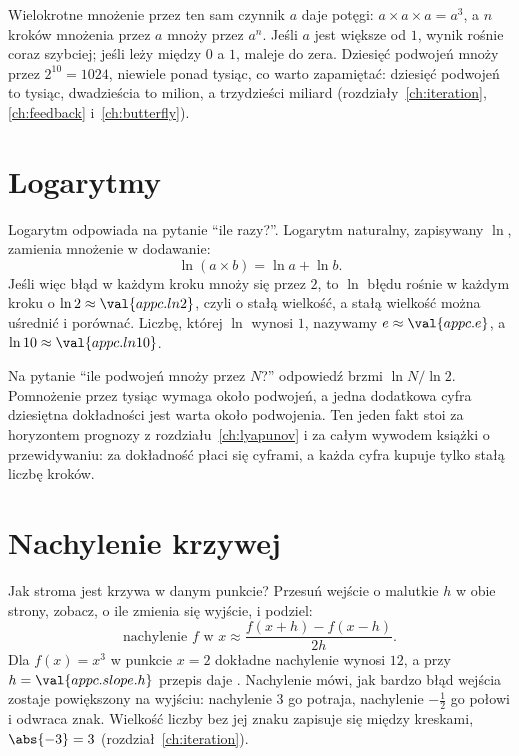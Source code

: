 \noindent
Wielokrotne mnożenie przez ten sam czynnik $a$ daje potęgi:
$a \times a \times a = a^{3}$, a $n$ kroków mnożenia przez $a$ mnoży przez
$a^{n}$. Jeśli $a$ jest większe od $1$, wynik rośnie coraz szybciej; jeśli
leży między $0$ a $1$, maleje do zera. Dziesięć podwojeń mnoży przez
$2^{10} = 1024$, niewiele ponad tysiąc, co warto zapamiętać: dziesięć
podwojeń to tysiąc, dwadzieścia to milion, a trzydzieści miliard
(rozdziały~\ref{ch:iteration}, \ref{ch:feedback} i~\ref{ch:butterfly}).

\section{Logarytmy}
\label{sec:appc-logs}

\noindent
Logarytm odpowiada na pytanie \enquote{ile razy?}. Logarytm naturalny,
zapisywany $\ln$, zamienia mnożenie w dodawanie:
\[ \ln(a \times b) = \ln a + \ln b . \]
Jeśli więc błąd w każdym kroku mnoży się przez $2$, to $\ln$ błędu rośnie w
każdym kroku o $\ln 2 \approx \val{appc.ln2}$, czyli o stałą wielkość, a stałą
wielkość można uśrednić i porównać. Liczbę, której $\ln$ wynosi $1$,
nazywamy $e \approx \val{appc.e}$, a $\ln 10 \approx \val{appc.ln10}$.

Na pytanie \enquote{ile podwojeń mnoży przez $N$?} odpowiedź brzmi
$\ln N / \ln 2$. Pomnożenie przez tysiąc wymaga około
 podwojeń, a jedna dodatkowa cyfra dziesiętna
dokładności jest warta około  podwojenia. Ten
jeden fakt stoi za horyzontem prognozy z rozdziału~\ref{ch:lyapunov} i za
całym wywodem książki o przewidywaniu: za dokładność płaci się cyframi, a
każda cyfra kupuje tylko stałą liczbę kroków.

\section{Nachylenie krzywej}
\label{sec:appc-slope}

\noindent
Jak stroma jest krzywa w danym punkcie? Przesuń wejście o malutkie $h$ w
obie strony, zobacz, o ile zmienia się wyjście, i podziel:
\[ \text{nachylenie } f \text{ w } x \approx \frac{f(x+h) - f(x-h)}{2h} . \]
Dla $f(x) = x^{3}$ w punkcie $x = 2$ dokładne nachylenie wynosi $12$, a przy
$h = \val{appc.slope.h}$ przepis daje . Nachylenie
mówi, jak bardzo błąd wejścia zostaje powiększony na wyjściu: nachylenie $3$
go potraja, nachylenie $-\tfrac{1}{2}$ go połowi i odwraca znak. Wielkość
liczby bez jej znaku zapisuje się między kreskami, $\abs{-3} = 3$
(rozdział~\ref{ch:iteration}).

